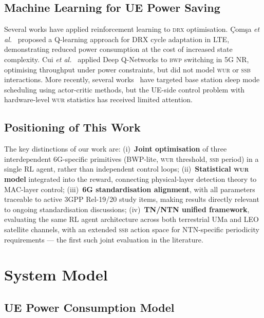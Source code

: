 \documentclass[conference]{IEEEtran}
\newcommand{\bwp}{\textsc{bwp}}
\newcommand{\wur}{\textsc{wur}}
\newcommand{\ssb}{\textsc{ssb}}
\newcommand{\drx}{\textsc{drx}}
\begin{document}
\subsection{Machine Learning for UE Power Saving}

Several works have applied reinforcement learning to \drx{} optimisation.
\c{C}om\c{s}a \textit{et al.}~\cite{comsa2020} proposed a Q-learning
approach for DRX cycle adaptation in LTE, demonstrating reduced power
consumption at the cost of increased state complexity.
Cui \textit{et al.}~\cite{cui2022} applied Deep Q-Networks to \bwp{}
switching in 5G NR, optimising throughput under power constraints, but
did not model \wur{} or \ssb{} interactions.
More recently, several works~\cite{zhang2023,lee2024} have targeted
base station sleep mode scheduling using actor-critic methods, but the
UE-side control problem with hardware-level \wur{} statistics has received
limited attention.

\subsection{Positioning of This Work}

The key distinctions of our work are:
(i)~\textbf{Joint optimisation} of three interdependent 6G-specific
    primitives (BWP-lite, \wur{} threshold, \ssb{} period) in a single
    RL agent, rather than independent control loops;
(ii)~\textbf{Statistical \wur{} model} integrated into the reward,
    connecting physical-layer detection theory to MAC-layer control;
(iii)~\textbf{6G standardisation alignment}, with all parameters
    traceable to active 3GPP Rel-19/20 study items, making results
    directly relevant to ongoing standardisation discussions;
(iv)~\textbf{TN/NTN unified framework}, evaluating the same RL agent
    architecture across both terrestrial UMa and LEO satellite channels,
    with an extended \ssb{} action space for NTN-specific periodicity
    requirements — the first such joint evaluation in the literature.

\section{System Model}
\label{sec:system}

\subsection{UE Power Consumption Model}
\end{document}
